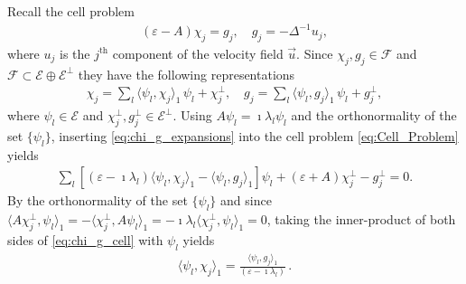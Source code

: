 \documentclass{article}
\newcommand{\Fc}{\mathcal{F}}
\newcommand{\Ec}{\mathcal{E}}
\newcommand{\0}{\mathbf{0}}
\newcommand{\1}{\mathbf{1}}
\newcommand{\2}{\mathbf{2}}
\newcommand{\3}{\mathbf{3}}
\newcommand{\4}{\mathbf{4}}
\newcommand{\5}{\mathbf{5}}
\newcommand{\6}{\mathbf{6}}
\newcommand{\7}{\mathbf{7}}
\newcommand{\8}{\mathbf{8}}
\begin{document}
Recall the cell problem
% 
\begin{align}\label{eq:Cell_Problem}
  (\varepsilon-A)\chi_j=g_j, \quad g_j=-\Delta^{-1}u_j,
\end{align}
%
where $u_j$ is the $j^{\text{th}}$ component of the velocity field
$\vec{u}$. Since $\chi_j,g_j\in\Fc$ and $\Fc\subset\Ec\oplus\Ec^\perp$ they have the
following representations 
%
\begin{align}\label{eq:chi_g_expansions}
  \chi_j=\sum_l\langle\psi_l,\chi_j\rangle_1\,\psi_l +\chi_j^\perp, \quad  g_j=\sum_l\langle\psi_l,g_j\rangle_1\,\psi_l +g_j^\perp,
\end{align}
%
where $\psi_l\in\Ec$ and $\chi_j^\perp,g_j^\perp\in\Ec^\perp$. Using $A\psi_l=\imath\lambda_l\psi_l$ and the
orthonormality of the set $\{\psi_l\}$, inserting
\eqref{eq:chi_g_expansions} into the cell problem
\eqref{eq:Cell_Problem} yields
%
\begin{align}\label{eq:chi_g_cell}
  \sum_l[(\varepsilon-\imath\lambda_l)\langle\psi_l,\chi_j\rangle_1-\langle\psi_l,g_j\rangle_1]\psi_l+(\varepsilon+A)\chi_j^\perp-g_j^\perp=0.
\end{align}
%
By the orthonormality of the set $\{\psi_l\}$ and since
$\langle A\chi_j^\perp,\psi_l\rangle_1=-\langle\chi_j^\perp,A\psi_l\rangle_1=-\imath\lambda_l\langle\chi_j^\perp,\psi_l\rangle_1=0$, taking the
inner-product of both sides of \eqref{eq:chi_g_cell} with $\psi_l$ yields 
%
\begin{align}\label{eq:Coefficients}
  \langle\psi_l,\chi_j\rangle_1=\frac{\langle\psi_l,g_j\rangle_1}{(\varepsilon-\imath\lambda_l)}\,.
\end{align}
%
\end{document}
